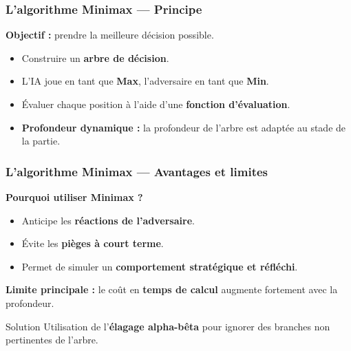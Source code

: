\begin{frame}
\frametitle{L’algorithme Minimax — Principe}

\textbf{Objectif :} prendre la meilleure décision possible.

\begin{itemize}
    \item Construire un \textbf{arbre de décision}.
    \item L’IA joue en tant que \textbf{Max}, l’adversaire en tant que \textbf{Min}.
    \item Évaluer chaque position à l’aide d’une \textbf{fonction d'évaluation}.
    \item \textbf{Profondeur dynamique :} la profondeur de l’arbre est adaptée au stade de la partie.
\end{itemize}

\begin{center}
\end{center}

\end{frame}

\begin{frame}
\frametitle{L’algorithme Minimax — Avantages et limites}

\textbf{Pourquoi utiliser Minimax ?}

\begin{itemize}
    \item Anticipe les \textbf{réactions de l’adversaire}.
    \item Évite les \textbf{pièges à court terme}.
    \item Permet de simuler un \textbf{comportement stratégique et réfléchi}.
\end{itemize}

\vspace{1em}
\textbf{Limite principale :} le coût en \textbf{temps de calcul} augmente fortement avec la profondeur.

\begin{block}{Solution}
Utilisation de l’\textbf{élagage alpha-bêta} pour ignorer des branches non pertinentes de l’arbre.
\end{block}
\end{frame}
